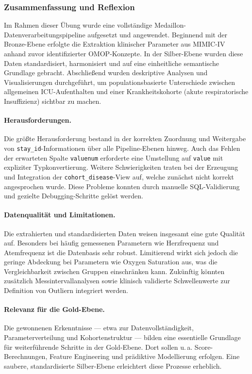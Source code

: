 \documentclass[12pt]{article}
\begin{document}
\subsubsection{Zusammenfassung und Reflexion}

Im Rahmen dieser Übung wurde eine vollständige Medaillon-Datenverarbeitungspipeline aufgesetzt und angewendet. Beginnend mit der Bronze-Ebene erfolgte die Extraktion klinischer Parameter aus MIMIC-IV anhand zuvor identifizierter OMOP-Konzepte. In der Silber-Ebene wurden diese Daten standardisiert, harmonisiert und auf eine einheitliche semantische Grundlage gebracht. Abschließend wurden deskriptive Analysen und Visualisierungen durchgeführt, um populationsbasierte Unterschiede zwischen allgemeinen ICU-Aufenthalten und einer Krankheitskohorte (akute respiratorische Insuffizienz) sichtbar zu machen.

\paragraph{Herausforderungen.} 
Die größte Herausforderung bestand in der korrekten Zuordnung und Weitergabe von \texttt{stay\_id}-Informationen über alle Pipeline-Ebenen hinweg. Auch das Fehlen der erwarteten Spalte \texttt{valuenum} erforderte eine Umstellung auf \texttt{value} mit expliziter Typkonvertierung. Weitere Schwierigkeiten traten bei der Erzeugung und Integration der \texttt{cohort\_disease}-View auf, welche zunächst nicht korrekt angesprochen wurde. Diese Probleme konnten durch manuelle SQL-Validierung und gezielte Debugging-Schritte gelöst werden.

\paragraph{Datenqualität und Limitationen.}
Die extrahierten und standardisierten Daten weisen insgesamt eine gute Qualität auf. Besonders bei häufig gemessenen Parametern wie Herzfrequenz und Atemfrequenz ist die Datenbasis sehr robust. Limitierend wirkt sich jedoch die geringe Abdeckung bei Parametern wie Oxygen Saturation aus, was die Vergleichbarkeit zwischen Gruppen einschränken kann. Zukünftig könnten zusätzlich Messintervallanalysen sowie klinisch validierte Schwellenwerte zur Definition von Outliern integriert werden.

\paragraph{Relevanz für die Gold-Ebene.}
Die gewonnenen Erkenntnisse — etwa zur Datenvollständigkeit, Parameterverteilung und Kohortenstruktur — bilden eine essentielle Grundlage für weiterführende Schritte in der Gold-Ebene. Dort sollen u.\,a. Score-Berechnungen, Feature Engineering und prädiktive Modellierung erfolgen. Eine saubere, standardisierte Silber-Ebene erleichtert diese Prozesse erheblich.
\end{document}
